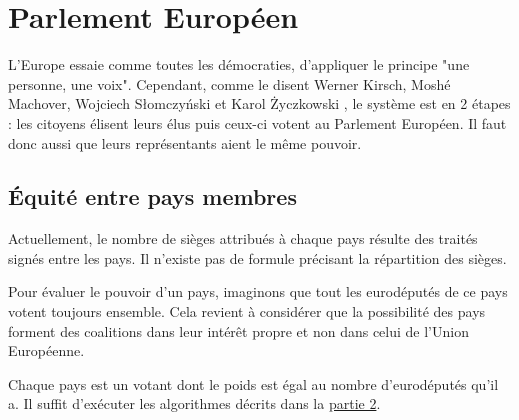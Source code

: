 

\section{Parlement Européen}

L'Europe essaie comme toutes les démocraties, d'appliquer le principe "une personne, une voix". Cependant, comme le disent Werner Kirsch, Moshé Machover, Wojciech Słomczyński et Karol Życzkowski \cite{penrose62}, le système est en 2 étapes : les citoyens élisent leurs élus puis ceux-ci votent au Parlement Européen. Il faut donc aussi que leurs représentants aient le même pouvoir.


\subsection{Équité entre pays membres}

Actuellement, le nombre de sièges attribués à chaque pays résulte des traités signés entre les pays. Il n'existe pas de formule précisant la répartition des sièges.

Pour évaluer le pouvoir d'un pays, imaginons que tout les eurodéputés de ce pays votent toujours ensemble. Cela revient à considérer que la possibilité des pays forment des coalitions dans leur intérêt propre et non dans celui de l'Union Européenne. \par
Chaque pays est un votant dont le poids est égal au nombre d'eurodéputés qu'il a. Il suffit d'exécuter les algorithmes décrits dans la \hyperlink{section.2}{partie 2}.

